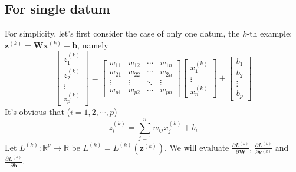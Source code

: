 \documentclass{article}
\newcommand{\Derivative}[2]{\ensuremath{\frac{\partial#1}{\partial#2}}}
\begin{document}
\subsection{For single datum}
For simplicity, let's first consider the case of only one datum, the $k$-th example: $\boldsymbol{z}^{(k)}=\boldsymbol{W}\boldsymbol{x}^{(k)}+\boldsymbol{b}$, namely\begin{equation}
    \begin{bmatrix}
        z^{(k)}_1\\z^{(k)}_2\\\vdots\\z^{(k)}_p
    \end{bmatrix}=\begin{bmatrix}
        w_{11}&w_{12}&\cdots&w_{1n}\\
        w_{21}&w_{22}&\cdots&w_{2n}\\
        \vdots&\vdots&\ddots&\vdots\\
        w_{p1}&w_{p2}&\cdots&w_{pn}
    \end{bmatrix}\begin{bmatrix}
        x^{(k)}_1\\\vdots\\x^{(k)}_n
    \end{bmatrix}+\begin{bmatrix}
        b_1\\b_2\\\vdots\\b_p
    \end{bmatrix}
\end{equation}
It's obvious that ($i=1,2,\cdots,p$)
\begin{equation}\label{eq:what is z_i^k}
    z^{(k)}_i=\sum_{j=1}^n w_{ij}x^{(k)}_j+b_i
\end{equation}
Let $L^{(k)}:\mathbb{R}^{p}\mapsto\mathbb{R}$ be $L^{(k)}=L^{(k)}(\boldsymbol{z}^{(k)})$. We will evaluate $\Derivative{L^{(k)}}{\boldsymbol{W}}$,  $\Derivative{L^{(k)}}{\boldsymbol{x}^{(k)}}$ and $\Derivative{L^{(k)}}{\boldsymbol{b}}$.
\end{document}
